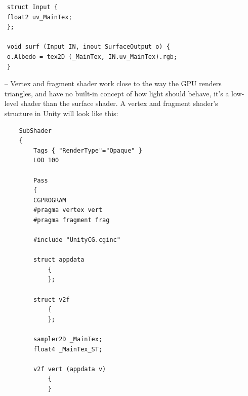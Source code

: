 \documentclass[a4paper, 13pt]{extarticle}
\begin{document}
{\begin{lstlisting}
 	struct Input {
 	float2 uv_MainTex;
 	};
 	
 	void surf (Input IN, inout SurfaceOutput o) {
 	o.Albedo = tex2D (_MainTex, IN.uv_MainTex).rgb;
 	}
 	\end{lstlisting}
 	
 \begin{itemize}
 	\item[--] Vertex and fragment shader work close to the way the GPU renders triangles, and have no built-in concept of how light should behave, it's a low-level shader than the surface shader. A vertex and fragment shader's structure in Unity will look like this:
 		\begin{lstlisting}
 	SubShader
 	{
 		Tags { "RenderType"="Opaque" }
 		LOD 100
 		
 		Pass
 		{
 		CGPROGRAM
 		#pragma vertex vert
 		#pragma fragment frag
 		
 		#include "UnityCG.cginc"
 		
 		struct appdata
 			{
 			};
 		
 		struct v2f
 			{
 			};
 			
 		sampler2D _MainTex;
 		float4 _MainTex_ST;
 		
 		v2f vert (appdata v)
 			{
 			}
 		

\end{lstlisting}
\end{itemize}}
\end{document}
